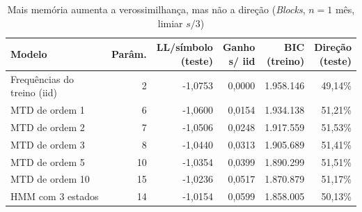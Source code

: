 \begin{table}[htb]
  \centering
  \caption{Mais memória aumenta a verossimilhança, mas não a direção (\textit{Blocks}, $n=1$ mês, limiar $s/3$)}
  \label{tab:mtd_ordem}
  \small
  \begin{tabular}{lrrrrr}
    \toprule
    Modelo & Parâm. & \shortstack[r]{LL/símbolo\\(teste)} & \shortstack[r]{Ganho\\s/ iid} & \shortstack[r]{BIC\\(treino)} & \shortstack[r]{Direção\\(teste)} \\
    \midrule
    Frequências do treino (iid) & 2 & -1,0753 & 0,0000 & 1.958.146 & 49,14\% \\
    MTD de ordem 1 & 6 & -1,0600 & 0,0154 & 1.934.138 & 51,21\% \\
    MTD de ordem 2 & 7 & -1,0506 & 0,0248 & 1.917.559 & 51,53\% \\
    MTD de ordem 3 & 8 & -1,0440 & 0,0313 & 1.905.689 & 51,41\% \\
    MTD de ordem 5 & 10 & -1,0354 & 0,0399 & 1.890.299 & 51,51\% \\
    MTD de ordem 10 & 15 & -1,0236 & 0,0517 & 1.870.879 & 51,17\% \\
    HMM com 3 estados & 14 & -1,0154 & 0,0599 & 1.858.005 & 50,13\% \\
    \bottomrule
  \end{tabular}
\end{table}

